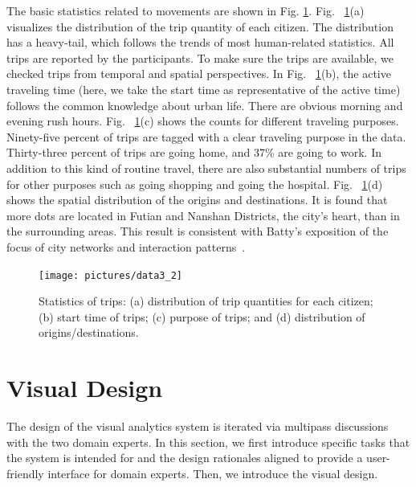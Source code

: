 \documentclass{ieeeaccess}
\begin{document}
The basic statistics related to movements are shown in Fig. \ref{fig:data_geometry}. Fig. ~\ref{fig:data_geometry}(a) visualizes the distribution of the trip quantity of each citizen. The distribution has a heavy-tail, which follows the trends of most human-related statistics. All trips are reported by the participants. To make sure the trips are available, we checked trips from temporal and spatial perspectives. In Fig. ~\ref{fig:data_geometry}(b), the active traveling time (here, we take the start time as representative of the active time) follows the common knowledge about urban life. There are obvious morning and evening rush hours. Fig. ~\ref{fig:data_geometry}(c) shows the counts for different traveling purposes. Ninety-five percent of trips are tagged with a clear traveling purpose in the data. Thirty-three percent of trips are going home, and 37\% are going to work. In addition to this kind of routine travel, there are also substantial numbers of trips for other purposes such as going shopping and going the hospital. Fig. ~\ref{fig:data_geometry}(d) shows the spatial distribution of the origins and destinations. It is found that more dots are located in Futian and Nanshan Districts, the city's heart, than in the surrounding areas. This result is consistent with Batty's exposition of the focus of city networks and interaction patterns~\cite{batty2013new}.


\begin{figure}[htb!]
 \centering %
 \texttt{[image: pictures/data3\_2]}
 \caption{Statistics of trips: (a) distribution of trip quantities for each citizen; (b) start time of trips; (c) purpose of trips; and (d) distribution of origins/destinations. }
 \label{fig:data_geometry}
\end{figure}



\section{Visual Design}

The design of the visual analytics system is iterated via multipass discussions with the two domain experts. In this section, we first introduce specific tasks that the system is intended for and the design rationales aligned to provide a user-friendly interface for domain experts. Then, we introduce the visual design.
\end{document}

